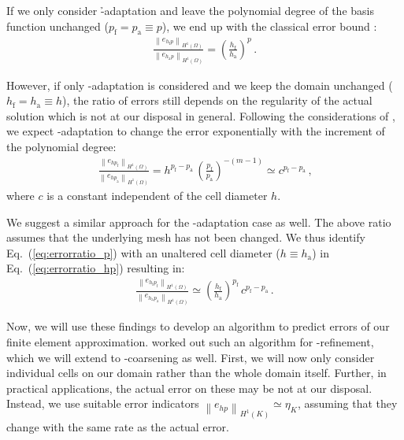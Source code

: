 If we only consider \h-adaptation and leave the polynomial degree of the basis function unchanged ($p_\text{f} = p_\text{a} \equiv p$), we end up with the classical error bound \parencite{babuska1990}:
\begin{align}
\label{eq:errorratio_h} \frac{\left\|e_{h_\text{f} p}\right\|_{H^{1}(\Omega)}}{\left\|e_{h_\text{a} p}\right\|_{H^{1}(\Omega)}} = \left( \frac{h_\text{f}}{h_\text{a}} \right)^p \,\text{.}
\end{align}

However, if only \p-adaptation is considered and we keep the domain unchanged ($h_\text{f} = h_\text{a} \equiv h$), the ratio of errors still depends on the regularity of the actual solution which is not at our disposal in general. Following the considerations of \cite{melenk2001}, we expect \p-adaptation to change the error exponentially with the increment of the polynomial degree:
\begin{align}
\label{eq:errorratio_p} \frac{\left\|e_{h p_\text{f}}\right\|_{H^{1}(\Omega)}}{\left\|e_{h p_\text{a}}\right\|_{H^{1}(\Omega)}} = h^{p_\text{f} - p_\text{a}} \, \left(\frac{p_\text{f}}{p_\text{a}}\right)^{-(m-1)} \simeq c^{p_\text{f} - p_\text{a}} \,\text{,}
\end{align}
where $c$ is a constant independent of the cell diameter $h$.

We suggest a similar approach for the \hp-adaptation case as well. The above ratio assumes that the underlying mesh has not been changed. We thus identify Eq.~(\ref{eq:errorratio_p}) with an unaltered cell diameter ($h \equiv h_\text{a}$) in Eq.~(\ref{eq:errorratio_hp}) resulting in:
\begin{align}
\label{eq:errorratio_hp_exp} \frac{\left\|e_{h_\text{f} p_\text{f}}\right\|_{H^{1}(\Omega)}}{\left\|e_{h_\text{a} p_\text{a}}\right\|_{H^{1}(\Omega)}} \simeq \left( \frac{h_\text{f}}{h_\text{a}} \right)^{p_\text{f}} \, c^{p_\text{f} - p_\text{a}} \,\text{.}
\end{align}

Now, we will use these findings to develop an algorithm to predict errors of our finite element approximation. \textcite{melenk2001} worked out such an algorithm for \hp-refinement, which we will extend to \hp-coarsening as well. First, we will now only consider individual cells on our domain rather than the whole domain itself. Further, in practical applications, the actual error on these may be not at our disposal. Instead, we use suitable error indicators $\left\|e_{hp}\right\|_{H^{1}(K)} \simeq \eta_K$, assuming that they change with the same rate as the actual error.

